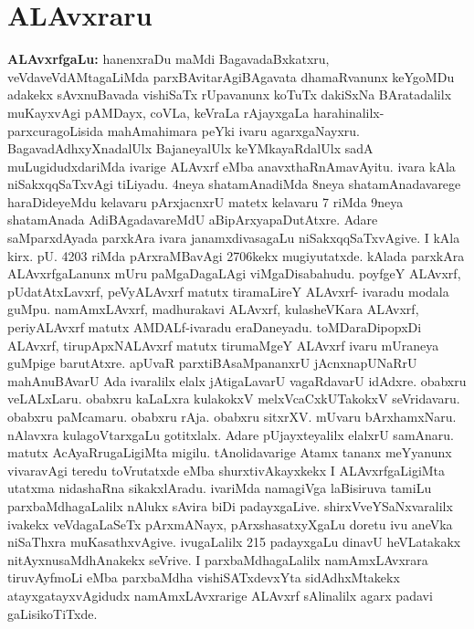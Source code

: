 \chapter{ALAvxraru}\label{chap008}

{\textbf{ALAvxrfgaLu:}} hanenxraDu maMdi BagavadaBxkatxru, veVdaveVdAMtagaLiMda parxBAvitarAgi\break BAgavata dhamaRvanunx keYgoMDu adakekx sAvxnuBavada vishiSaTx rUpavanunx koTuTx dakiSxNa BArata\-dalilx  muKayxvAgi pAMDayx, coVLa, keVraLa rAjayxgaLa harahinalilx-parxcuragoLisida mahAmahimara peYki ivaru agarxgaNayxru. BagavadAdhxyXnadalUlx BajaneyalUlx keYMkayaR\-dalUlx sadA muLugidudxdariMda ivarige ALAvxrf eMba anavxthaRnAmavAyitu. ivara kAla niSakxqqSaTxvAgi tiLiyadu. {\rm4}neya shatamAnadiMda {\rm8}neya shatamAnadavarege haraDideyeMdu kelavaru pArxjacnxrU matetx kelavaru {\rm 7} riMda {\rm 9}neya shatamAnada AdiBAgadavareMdU aBipArxyapaDutAtxre. Adare saMparxdAyada parxkAra ivara janamxdivasagaLu niSakxqqSaTxvAgive. I kAla kirx. pU. {\rm 4203} riMda pArxraMBavAgi {\rm 2706}kekx mugiyutatxde. kAlada parxkAra ALAvxrfgaLanunx mUru paMgaDagaLAgi viMgaDisabahudu. poyfgeY ALAvxrf, pUdatAtxLavxrf, peVyALAvxrf matutx tiramaLireY ALAvxrf- ivaradu modala guMpu. namAmxLAvxrf, madhurakavi ALAvxrf, kulasheVKara ALAvxrf, periyALAvxrf matutx AMDALf-ivaradu eraDaneyadu. toMDaraDipopxDi ALAvxrf, tirupApxNALAvxrf matutx tirumaMgeY ALAvxrf ivaru mUraneya guMpige barutAtxre. apUvaR parxtiBAsaMpananxrU jAcnxnapUNaRrU mahAnuBAvarU Ada ivaralilx elalx jAtigaLavarU vagaRdavarU idAdxre. obabxru veLALxLaru. obabxru kaLaLxra kulakokxV melxVcaCxkUTakokxV seVridavaru. obabxru paMcamaru. obabxru rAja. obabxru sitxrXV. mUvaru bArxhamxNaru. nAlavxra kulagoVtarxgaLu gotitxlalx. Adare pUjayxteyalilx elalxrU samAnaru. matutx AcAyaRrugaLigiMta migilu. tAnolidavarige Atamx tananx meYyanunx vivaravAgi teredu toVrutatxde eMba shurxtivAkayxkekx I ALAvxrfgaLigiMta utatxma nidashaRna sikakxlAradu. ivariMda namagiVga laBisiruva tamiLu parxbaMdhagaLalilx nAlukx sAvira biDi padayxgaLive. shirxVveYSaNxvaralilx ivakekx veVdagaLaSeTx pArxmANayx, pArxshasatxyXgaLu doretu ivu aneVka niSaThxra muKasathxvAgive. ivugaLalilx {\rm 215} padayxgaLu dinavU heVLatakakx nitAyxnusaMdhAnakekx seVrive. I parxbaMdhagaLalilx namAmxLAvxrara tiruvAyfmoLi eMba parxbaMdha vishiSATxdevxYta sidAdhxMtakekx atayxgatayxvAgidudx namAmxLAvxrarige ALAvxrf sAlinalilx agarx padavi gaLisikoTiTxde.

